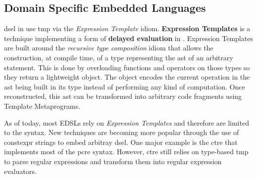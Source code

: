 \documentclass[../main]{subfiles}
\begin{document}
%



\subsection{
  \cpp Domain Specific Embedded Languages
}

\gls{dsel}\acrpluralsuffix{} in \cpp use \gls{tmp} via the \textit{Expression
Template} idiom.
\textbf{Expression Templates} \cite{veldhuizen:1995,vandevoorde:2002} is a
technique implementing a form of \textbf{delayed evaluation} in
\cpp \cite{spinellis:2001}. Expression Templates are built around the
\textit{recursive type composition} idiom \cite{jarvi:1998} that allows the
construction, at compile time, of a type representing the \gls{ast}
of an arbitrary statement. This is done by overloading functions and operators
on those types so they return a lightweight object.
The object encodes the current operation in the \gls{ast}
being built in its type instead of performing any kind of computation.
Once reconstructed, this \gls{ast} can be transformed into arbitrary code fragments
using Template Metaprograms.

As of today, most \cpp EDSLs rely on \textit{Expression Templates} and therefore
are limited to the \cpp syntax. New techniques are becoming more popular through
the use of \gls{constexpr} strings to embed arbitray
\gls{dsel}\acrpluralsuffix{}. One major example is the \gls{ctre} \cite{ctre}
that implements most of the \gls{pcre} syntax.
However, \gls{ctre} still relies on type-based \gls{tmp} to parse
regular expressions and transform them into regular expression evaluators.


\end{document}
